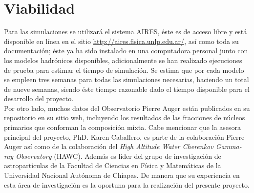 \section{Viabilidad}
Para las simulaciones se utilizará el sistema AIRES, éste es de acceso libre y está disponible en línea en el sitio \url{http://aires.fisica.unlp.edu.ar/}, así como toda su documentación; éste ya ha sido instalado en una computadora personal junto con los modelos hadrónicos disponibles, adicionalmente se han realizado ejecuciones de prueba para estimar el tiempo de simulación. Se estima que por cada modelo se empleen tres semanas para todas las simulaciones necesarias, haciendo un total de nueve semanas, siendo éste tiempo razonable dado el tiempo disponible para el desarrollo del proyecto.\\ 

Por otro lado, muchos datos del Observatorio Pierre Auger están publicados en su repositorio en su sitio web, incluyendo los resultados de las fracciones de núcleos primarios que conforman la composición mixta. Cabe mencionar que la asesora principal del proyecto, PhD. Karen Caballero, es parte de la colaboración Pierre Auger así como de la colaboración del \textit{High Altitude Water Cherenkov Gamma-ray Observatory} (HAWC). Además es líder del grupo de investigación de astropartículas de la Facultad de Ciencias en Física y Matemáticas de la Universidad Nacional Autónoma de Chiapas. De manera que su experiencia en esta área de investigación es la oportuna para la realización del presente proyecto.



\singlespace
